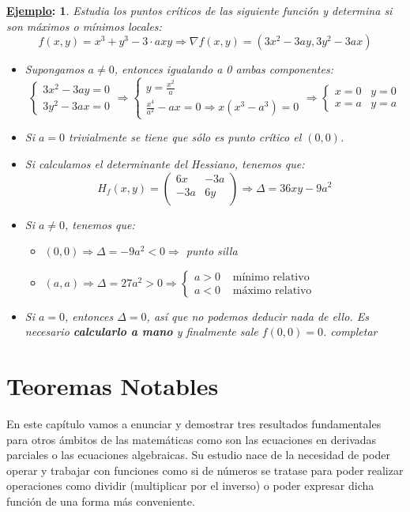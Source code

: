 \documentclass[10pt,a4paper,openright]{book}
\theoremstyle{break}
\newtheorem*{ej}{\underline{Ejemplo}:}
\begin{document}
\begin{ej}
Estudia los puntos críticos de las siguiente función y determina si son máximos o mínimos locales:
$$f(x,y) = x^3 + y^3 - 3 \cdot a xy \Rightarrow \nabla f(x,y) = (3x^2 - 3ay, 3y^2 - 3ax)$$
\begin{itemize}
\item Supongamos $a \neq 0$, entonces igualando a 0 ambas componentes:
$$\begin{cases} 3x^2 - 3ay = 0 \\ 3y^2 - 3ax = 0 \end{cases} \Rightarrow\begin{cases} y = \frac{x^2}{a} \\ \frac{x^4}{a^2} - ax = 0 \Rightarrow x (x^3 - a^3) = 0  \end{cases} \Rightarrow \begin{cases} x = 0 & y = 0 \\ x = a & y =a \end{cases}$$
\item Si $a = 0$ trivialmente se tiene que sólo es punto crítico el $(0,0)$.
\item Si calculamos el determinante del Hessiano, tenemos que:
$$H_f (x,y) = \begin{pmatrix} 6x & -3a \\ -3a & 6y  \\ \end{pmatrix} \Rightarrow \Delta = 36 xy - 9 a^2$$
\item Si $a \neq 0$, tenemos que:
\begin{itemize}
\item $(0,0) \Rightarrow \Delta = -9a^2 < 0 \Rightarrow $ punto silla
\item $(a,a) \Rightarrow \Delta = 27a^2 > 0 \Rightarrow \begin{cases} a > 0 & \mbox{ mínimo relativo} \\ a < 0 & \mbox{ máximo relativo} \end{cases}$
\end{itemize}
\item Si $a = 0$, entonces $\Delta = 0$, así que no podemos deducir nada de ello. Es necesario \textbf{calcularlo a mano} y finalmente sale $f(0,0) = 0$.
completar
\end{itemize}
\end{ej}

\chapter{Teoremas Notables}
En este capítulo vamos a enunciar y demostrar tres resultados fundamentales para otros ámbitos de las matemáticas como son las ecuaciones en derivadas parciales o las ecuaciones algebraicas. Su estudio nace de la necesidad de poder operar y trabajar con funciones como si de números se tratase para poder realizar operaciones como dividir (multiplicar por el inverso) o poder expresar dicha función de una forma más conveniente.
\end{document}
